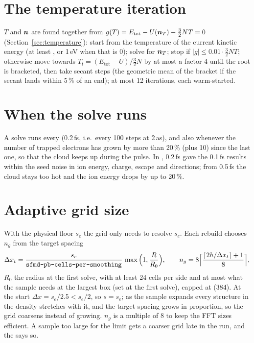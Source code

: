 \section{The temperature iteration}

$T$ and $\bm{n}$ are found together from $g(T) = E_{\mathrm{tot}} - U(\bm{n}_T) - \frac32NT = 0$
(Section~\ref{sec:temperature}):
start from the temperature of the current kinetic energy (at least , or 1\,eV when that is 0); solve for $\bm{n}_T$; stop if
$|g|\le0.01\cdot\frac32NT$; otherwise move towards $T_t = (E_{\mathrm{tot}}-U)/\frac32N$ by at most a factor 4 until the
root is bracketed, then take secant steps (the geometric mean of the bracket if the secant lands within 5\,\% of an
end); at most 12 iterations, each warm-started.

\section{When the solve runs}

A solve runs every  (0.2\,fs, i.e.\ every 100 steps at 2\,as), and also whenever the number of
trapped electrons has grown by more than 20\,\% (plus 10) since the last one, so that the cloud keeps up during the
pulse.
In , 0.2\,fs gave the 0.1\,fs results within the seed noise in ion energy, charge, escape and directions; from 0.5\,fs the
cloud stays too hot and the ion energy drops by up to 20\,\%.

\section{Adaptive grid size}

With the physical floor $s_e$ the grid only needs to resolve $s_e$.
Each rebuild chooses $n_g$ from the target spacing
\begin{equation}
  \Delta x_t = \frac{s_e}{\texttt{sfmd-pb-cells-per-smoothing}}\,\max\Big(1,\frac{R}{R_0}\Big),\qquad
  n_g = 8\Big\lceil\frac{\lceil 2h/\Delta x_t\rceil+1}{8}\Big\rceil,
\end{equation}
$R_0$ the radius at the first solve, with at least 24 cells per side and at most what the sample needs at the
largest box (set at the first solve), capped at  (384).
At the start $\Delta x = s_e/2.5 < s_e/2$, so $s=s_e$; as the sample expands every structure in the density stretches
with it, and the target spacing grows in proportion, so the grid coarsens instead of growing.
$n_g$ is a multiple of 8 to keep the FFT sizes efficient.
A sample too large for the limit gets a coarser grid late in the run, and the  says so.

